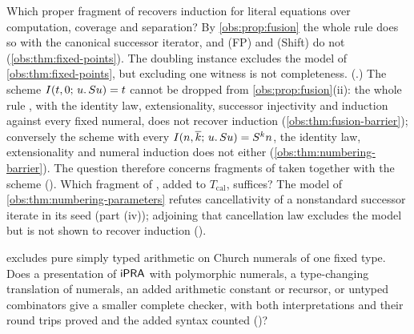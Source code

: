 \begin{question}
Which proper fragment of  recovers induction for literal
equations over computation, coverage and separation? By
\cref{obs:prop:fusion} the whole rule does so with the canonical successor
iterator, and (FP) and (Shift) do not (\cref{obs:thm:fixed-points}). The
doubling instance excludes the model of \cref{obs:thm:fixed-points}, but
excluding one witness is not completeness.
(.) The scheme
$I(t,0;\,u.\,S u)=t$ cannot be dropped from \cref{obs:prop:fusion}(ii):
the whole rule , with the identity law, extensionality,
successor injectivity and induction against every fixed numeral, does not
recover induction (\cref{obs:thm:fusion-barrier}); conversely the scheme with
every $I(n,\overline{k};\,u.\,S u)=S^{k}n$, the identity law,
extensionality and numeral induction does not either
(\cref{obs:thm:numbering-barrier}). The question therefore concerns fragments
of  taken together with the scheme
(). Which fragment of , added to
$T_{\mathrm{cal}}$, suffices? The model of \cref{obs:thm:numbering-parameters}
refutes cancellativity of a nonstandard successor iterate in its seed
(part (iv)); adjoining that cancellation law excludes the model but is not
shown to recover induction ().
\end{question}

\begin{question}
 excludes pure simply typed arithmetic on Church numerals
of one fixed type. Does a presentation of $\mathsf{iPRA}$ with polymorphic numerals, a
type-changing translation of numerals, an added arithmetic constant or
recursor, or untyped combinators give a smaller complete checker, with both
interpretations and their round trips proved and the added syntax counted
()?
\end{question}

